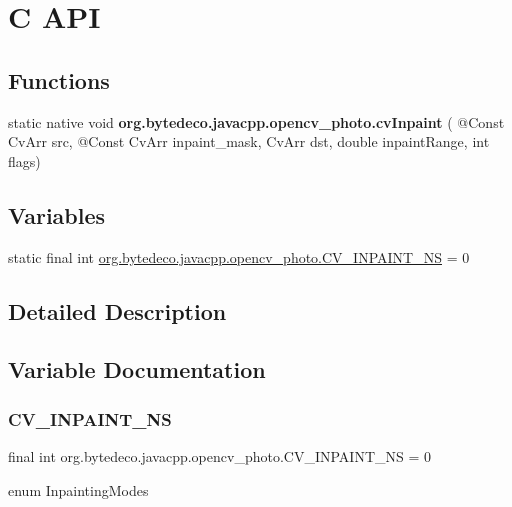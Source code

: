 \hypertarget{group__photo__c}{}\section{C A\+PI}
\label{group__photo__c}
\subsection*{Functions}
\begin{DoxyCompactItemize}
\item 
\mbox{\label{group__photo__c_ga48d16c7c61302fe29cbca53315ab59ee}} 
static native void {\bfseries org.\+bytedeco.\+javacpp.\+opencv\+\_\+photo.\+cv\+Inpaint} ( @Const Cv\+Arr src, @Const Cv\+Arr inpaint\+\_\+mask, Cv\+Arr dst, double inpaint\+Range, int flags)
\end{DoxyCompactItemize}
\subsection*{Variables}
\begin{DoxyCompactItemize}
\item 
static final int \hyperlink{group__photo__c_ga4a11abb5c18d99ce04f11105b1447eda}{org.\+bytedeco.\+javacpp.\+opencv\+\_\+photo.\+C\+V\+\_\+\+I\+N\+P\+A\+I\+N\+T\+\_\+\+NS} = 0
\end{DoxyCompactItemize}


\subsection{Detailed Description}


\subsection{Variable Documentation}
\mbox{\label{group__photo__c_ga4a11abb5c18d99ce04f11105b1447eda}} 
\subsubsection{\texorpdfstring{C\+V\+\_\+\+I\+N\+P\+A\+I\+N\+T\+\_\+\+NS}{CV\_INPAINT\_NS}}
{\footnotesize\ttfamily final int org.\+bytedeco.\+javacpp.\+opencv\+\_\+photo.\+C\+V\+\_\+\+I\+N\+P\+A\+I\+N\+T\+\_\+\+NS = 0\hspace{0.3cm}{\ttfamily [static]}}

enum Inpainting\+Modes 